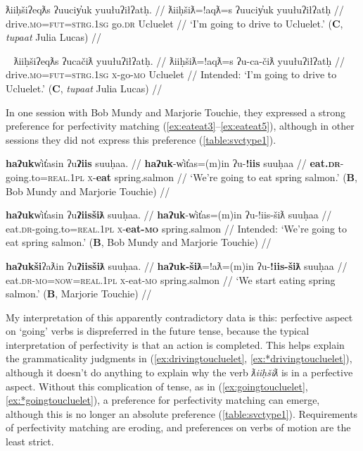 \ex \label{ex:drivingtoucluelet}
\begingl
\glpreamble ƛiiḥšiʔeqƛs ʔuuciy̓uk yuułuʔiłʔatḥ. //
\gla ƛiiḥšiƛ=!aqƛ=s ʔuuciy̓uk yuułuʔiłʔatḥ //
\glb drive.\textsc{mo}=\textsc{fut}=\textsc{strg.1sg} go.\textsc{dr} Ucluelet //
\glft `I'm going to drive to Ucluelet.' (\textbf{C}, \textit{tupaat} Julia Lucas) //
\endgl
\xe

\ex~ \label{ex:*drivingtoucluelet}
\begingl
\glpreamble *ƛiiḥšiʔeqƛs ʔucačiƛ yuułuʔiłʔatḥ. //
\gla ƛiiḥšiƛ=!aqƛ=s ʔu-ca-čiƛ yuułuʔiłʔatḥ //
\glb drive.\textsc{mo}=\textsc{fut}=\textsc{strg.1sg} \textsc{x}-go-\textsc{mo} Ucluelet //
\glft Intended: `I'm going to drive to Ucluelet.' (\textbf{C}, \textit{tupaat} Julia Lucas) //
\endgl
\xe

In one session with Bob Mundy and Marjorie Touchie, they expressed a strong preference for perfectivity matching (\ref{ex:eateat3}--\ref{ex:eateat5}), although in other sessions they did not express this preference (\cref{table:svctype1}).

\ex \label{ex:eateat3}
\begingl
\glpreamble \textbf{haʔuk}w̓it̓asin ʔu\textbf{ʔiis} suuḥaa. //
\gla \textbf{haʔuk}-w̓it̓as=(m)in ʔu-\textbf{!iis} suuḥaa //
\glb \textbf{eat.\textsc{dr}}-going.to=\textsc{real.1pl} \textsc{x}-\textbf{eat} spring.salmon //
\glft `We're going to eat spring salmon.' (\textbf{B}, Bob Mundy and Marjorie Touchie) //
\endgl
\xe

\ex \label{ex:*eateat4}
\begingl
\glpreamble *\textbf{haʔuk}w̓it̓asin ʔu\textbf{ʔiisšiƛ} suuḥaa. //
\gla \textbf{haʔuk}-w̓it̓as=(m)in ʔu-!iis-šiƛ suuḥaa //
\glb eat.\textsc{dr}-going.to=\textsc{real.1pl} \textsc{x}-\textbf{eat-\textsc{mo}} spring.salmon //
\glft Intended: `We're going to eat spring salmon.' (\textbf{B}, Bob Mundy and Marjorie Touchie) //
\endgl
\xe

\ex \label{ex:eateat5}
\begingl
\glpreamble \textbf{haʔukši}ʔaƛin ʔu\textbf{ʔiisšiƛ} suuḥaa. //
\gla \textbf{haʔuk-šiƛ}=!aƛ=(m)in ʔu-\textbf{!iis-šiƛ} suuḥaa //
\glb eat.\textsc{dr}-\textsc{mo}=\textsc{now}=\textsc{real.1pl} \textsc{x}-eat-\textsc{mo} spring.salmon //
\glft `We start eating spring salmon.' (\textbf{B}, Marjorie Touchie) //
\endgl
\xe

My interpretation of this apparently contradictory data is this: perfective aspect on `going' verbs is dispreferred in the future tense, because the typical interpretation of perfectivity is that an action is completed. This helps explain the grammaticality judgments in (\ref{ex:drivingtoucluelet}, \ref{ex:*drivingtoucluelet}), although it doesn't do anything to explain why the verb \textit{ƛiiḥšiƛ} is in a perfective aspect. Without this complication of tense, as in (\ref{ex:goingtoucluelet}, \ref{ex:*goingtoucluelet}), a preference for perfectivity matching can emerge, although this is no longer an absolute preference (\cref{table:svctype1}). Requirements of perfectivity matching are eroding, and preferences on verbs of motion are the least strict.

